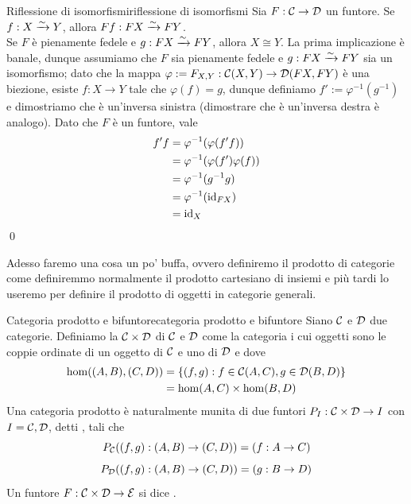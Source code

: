 \documentclass[openany]{book}
\renewcommand\C{\mc{C}}
\newcommand\D{\mc{D}}
\begin{document}
\begin{lemma}{Riflessione di isomorfismi}{riflessione di isomorfismi}
    Sia $F:\C\to\D$ un funtore. Se $f:X\xrightarrow{\sim} Y$, allora $Ff:FX\xrightarrow{\sim} FY$.\\
    Se $F$ è pienamente fedele e $g:FX\xrightarrow{\sim} FY$, allora $X\cong Y$.
    \proof 
    La prima implicazione è banale, dunque assumiamo che $F$ sia pienamente fedele e $g:FX\xrightarrow{\sim} FY$ sia un isomorfismo; dato che la mappa $\varphi := F_{X,Y} : \C(X,Y) \to \D(FX,FY)$ è una biezione, esiste $f: X\to Y$ tale che $\varphi(f) = g$, dunque definiamo $f' := \varphi^{-1}(g^{-1})$ e dimostriamo che è un'inversa sinistra (dimostrare che è un'inversa destra è analogo). Dato che $F$ è un funtore, vale
    \begin{align*}
        f'f  & = \varphi^{-1}(\varphi(f'f) )\\
        & =\varphi^{-1}(\varphi(f')\varphi(f)) \\
        & = \varphi^{-1}(g^{-1}g) \\
        & = \varphi^{-1}(\operatorname{id}_{FX}) \\
        & = \operatorname{id}_X
    \end{align*}
    \qed
\end{lemma}

Adesso faremo una cosa un po' buffa, ovvero definiremo il prodotto di categorie come definiremmo normalmente il prodotto cartesiano di insiemi e più tardi lo useremo per definire il prodotto di oggetti in categorie generali.

\begin{definition}{Categoria prodotto e bifuntore}{categoria prodotto e bifuntore}
    Siano $\C$ e $\D$ due categorie. Definiamo la  $\C\times\D$ di $\C$ e $\D$ come la categoria i cui oggetti sono le coppie ordinate di un oggetto di $\C$ e uno di $\D$ e dove
    \begin{align*}
        \hom((A,B),(C,D)) & = \left\{ (f,g) : f \in \C(A,C), g \in \D(B,D) \right\}\\
        & = \hom(A,C)\times \hom(B,D)
    \end{align*}
    Una categoria prodotto è naturalmente munita di due funtori $P_I : \C\times\D\to I$ con $I = \C,\D$, detti , tali che
    \[ P_\C ((f,g):(A,B)\to(C,D)) = (f:A\to C)\]
    \[ P_\D ((f,g):(A,B)\to(C,D)) = (g:B\to D)\]
    Un funtore $F:\C\times\D\to \mc{E}$ si dice .
\end{definition}
\end{document}
